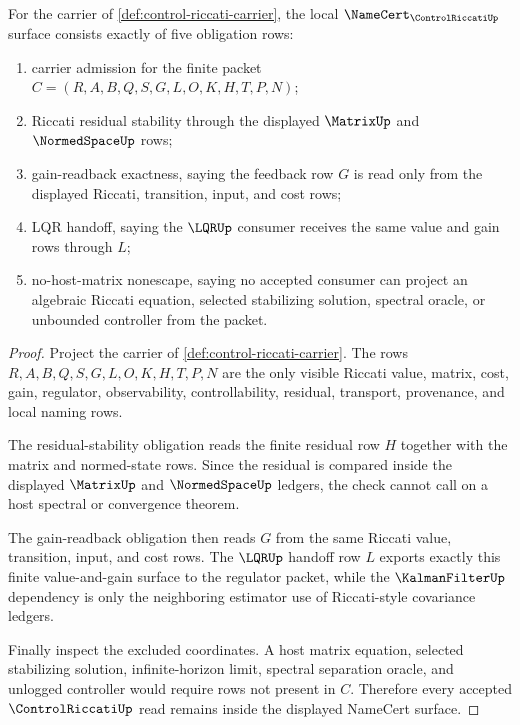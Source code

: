 \begin{theorem}
\label{thm:control-riccati-namecert-obligations}
For the carrier of \autoref{def:control-riccati-carrier}, the local $\NameCert_{\ControlRiccatiUp}$ surface consists exactly of five obligation rows:
\begin{enumerate}
\item carrier admission for the finite packet $C=(R,A,B,Q,S,G,L,O,K,H,T,P,N)$;
\item Riccati residual stability through the displayed $\MatrixUp$ and $\NormedSpaceUp$ rows;
\item gain-readback exactness, saying the feedback row $G$ is read only from the displayed Riccati, transition, input, and cost rows;
\item LQR handoff, saying the $\LQRUp$ consumer receives the same value and gain rows through $L$;
\item no-host-matrix nonescape, saying no accepted consumer can project an algebraic Riccati equation, selected stabilizing solution, spectral oracle, or unbounded controller from the packet.
\end{enumerate}
\end{theorem}
\begin{proof}
Project the carrier of \autoref{def:control-riccati-carrier}. The rows $R,A,B,Q,S,G,L,O,K,H,T,P,N$ are the only visible Riccati value, matrix, cost, gain, regulator, observability, controllability, residual, transport, provenance, and local naming rows.

The residual-stability obligation reads the finite residual row $H$ together with the matrix and normed-state rows. Since the residual is compared inside the displayed $\MatrixUp$ and $\NormedSpaceUp$ ledgers, the check cannot call on a host spectral or convergence theorem.

The gain-readback obligation then reads $G$ from the same Riccati value, transition, input, and cost rows. The $\LQRUp$ handoff row $L$ exports exactly this finite value-and-gain surface to the regulator packet, while the $\KalmanFilterUp$ dependency is only the neighboring estimator use of Riccati-style covariance ledgers.

Finally inspect the excluded coordinates. A host matrix equation, selected stabilizing solution, infinite-horizon limit, spectral separation oracle, and unlogged controller would require rows not present in $C$. Therefore every accepted $\ControlRiccatiUp$ read remains inside the displayed NameCert surface.
\end{proof}


